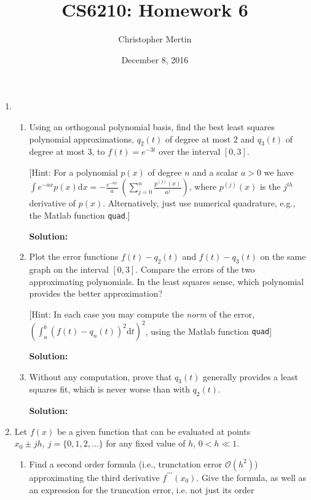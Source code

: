 \documentclass[12pt]{article}
\newcommand{\BigO}[1]{\mathcal{O}\left( #1 \right)}
\begin{document}
\title{CS6210: Homework 6}
\author{Christopher Mertin}
\date{December 8, 2016}
\maketitle

\begin{enumerate}
\item 

\begin{enumerate}
\item Using an orthogonal polynomial basis, find the best least squares polynomial approximations, $q_{2}(t)$ of degree at most 2 and $q_{3}(t)$ of degree at most 3, to $f(t) = e^{-3t}$ over the interval $[0,3]$.

[Hint: For a polynomial $p(x)$ of degree $n$ and a scalar $a > 0$ we have $\int e^{-ax}p(x)\text{d}x = -\frac{e^{-ax}}{a}\ \left( \sum_{j=0}^{n} \frac{p^{(j)}(x)}{a^{j}}\right)$, where $p^{(j)}(x)$ is the $j^{th}$ derivative of $p(x)$. Alternatively, just use numerical quadrature, e.g., the {\sc Matlab} function {\tt quad}.]

{\bf Solution:}

\item Plot the error functions $f(t) - q_{2}(t)$ and $f(t) - q_{3}(t)$ on the same graph on the interval $[0,3]$. Compare the errors of the two approximating polynomials. In the least squares sense, which polynomial provides the better approximation?

[Hint: In each case you may compute the {\em norm} of the error, $\left( \int_{a}^{b}(f(t) - q_{n}(t))^{2}\text{d}t \right)^{2}$, using the {\sc Matlab} function {\tt quad}]

{\bf Solution:}

\item Without any computation, prove that $q_{3}(t)$ generally provides a least squares fit, which is never worse than with $q_{2}(t)$. 

{\bf Solution:}
\end{enumerate}

\item Let $f(x)$ be a given function that can be evaluated at points $x_{0} \pm jh,\ j=\{0,1,2,\ldots\}$ for any fixed value of $h$, $0 < h \ll 1$.

\begin{enumerate}
\item Find a second order formula (i.e., trunctation error $\BigO{h^{2}}$) approximating the third derivative $f^{\prime \prime \prime}(x_{0})$. Give the formula, as well as an expression for the truncation error, i.e. not just its order


\end{enumerate}
\end{enumerate}
\end{document}
